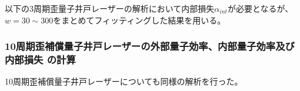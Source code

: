 {

以下の3周期歪量子井戸レーザーの解析において内部損失$\alpha_{int}$が必要となるが、$w=30\sim300$をまとめてフィッティングした結果を用いる。
\clearpage
\subsubsection{10周期歪補償量子井戸レーザーの外部量子効率、内部量子効率及び内部損失
の計算}
10周期歪補償量子井戸レーザーについても同様の解析を行った。

}
